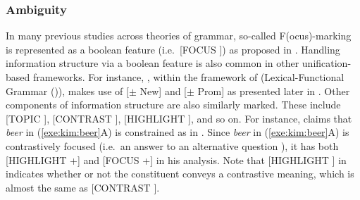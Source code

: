 \subsubsection{Ambiguity}
\label{8:ssec:hpsg:boolean}


In many previous studies across theories of grammar, so-called
F(ocus)-marking is represented as a boolean feature (i.e.\ [FOCUS
  ]) as proposed in \citet{zubizarreta:98}.  Handling
information structure via a boolean feature is also common in other
unification-based frameworks. For instance, \citet{choi:99}, within
the framework of  (Lexical-Functional Grammar
(\citealt{bresnan:01})), makes use of [\ensuremath{\pm} New] and
[\ensuremath{\pm} Prom] as presented later in .  Other
components of information structure are also similarly marked.  These
include [TOPIC ], [CONTRAST ], [HIGHLIGHT
  ], and so on. For instance, \citet{kim:07} claims that
\textit{beer} in (\ref{exe:kim:beer}A) is constrained as in
. Since \textit{beer} in (\ref{exe:kim:beer}A) is
contrastively focused (i.e.\ an answer to an alternative question
\citep{gryllia:09}), it has both [HIGHLIGHT +] and [FOCUS +] in his
analysis. Note that [HIGHLIGHT ] in 
indicates whether or not the constituent conveys a contrastive
meaning, which is almost the same as [CONTRAST ].





